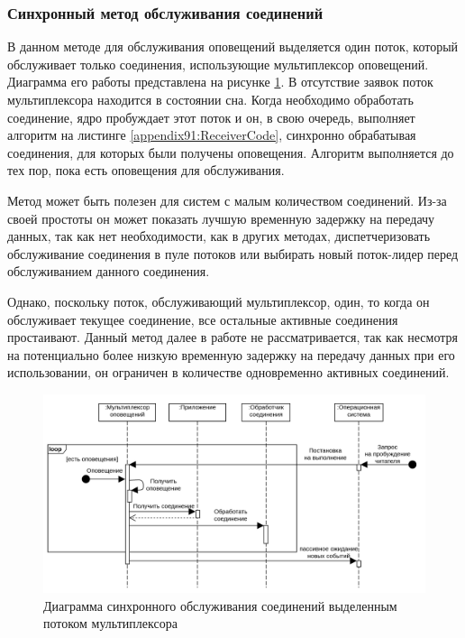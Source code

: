 \subsubsection{Синхронный метод обслуживания соединений}

В данном методе для обслуживания оповещений выделяется один поток, который обслуживает только соединения, использующие мультиплексор оповещений. Диаграмма его работы представлена на рисунке \ref{chapter31:SyncMuxSchema}.
В отсутствие заявок поток мультиплексора находится в состоянии сна. Когда необходимо обработать соединение, ядро пробуждает этот поток и он, в свою очередь, выполняет алгоритм на листинге \ref{appendix91:ReceiverCode}, синхронно обрабатывая соединения, для которых были получены оповещения. Алгоритм выполняется до тех пор, пока есть оповещения для обслуживания.

Метод может быть полезен для систем с малым количеством соединений. Из-за своей простоты он может показать лучшую временную задержку на передачу данных, так как нет необходимости, как в других методах, диспетчеризовать обслуживание соединения в пуле потоков или выбирать новый поток-лидер перед обслуживанием данного соединения.

Однако, поскольку поток, обслуживающий мультиплексор, один, то когда он обслуживает текущее соединение, все остальные активные соединения простаивают. Данный метод далее в работе не рассматривается, так как несмотря на потенциально более низкую временную задержку на передачу данных при его использовании, он ограничен в количестве одновременно активных соединений.

\begin{figure}[!h]
\caption{Диаграмма синхронного обслуживания соединений выделенным потоком мультиплексора}
\label{chapter31:SyncMuxSchema}
\includegraphics[width=\textwidth]{../../graphics/schemes/SyncMuxSequence}
\end{figure}


